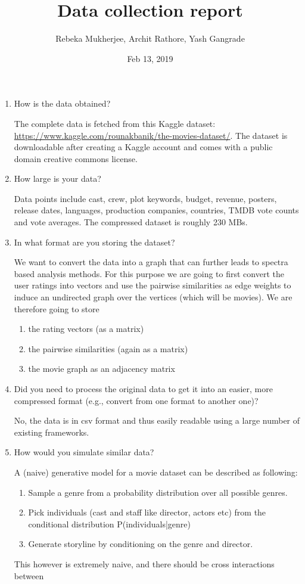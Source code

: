 \documentclass[11pt]{article}
\title{Data collection report}
\author{Rebeka Mukherjee, Archit Rathore, Yash Gangrade}
\date{Feb 13, 2019}
\begin{document}
\maketitle

\begin{enumerate}

\item How is the data obtained?

The complete data is fetched from this Kaggle dataset: \url{https://www.kaggle.com/rounakbanik/the-movies-dataset/}. The dataset is downloadable after creating a Kaggle account and comes with a public domain creative commons license.

\item How large is your data?

Data points include cast, crew, plot keywords, budget, revenue, posters, release dates, languages, production companies, countries, TMDB vote counts and vote averages. The compressed dataset is roughly 230 MBs.

\item In what format are you storing the dataset?

We want to convert the data into a graph that can further leads to spectra based analysis methods. For this purpose we are going to first convert the user ratings into vectors and use the pairwise similarities as edge weights to induce an undirected graph over the vertices (which will be movies). We are therefore going to store
\begin{enumerate}
	\item the rating vectors (as a matrix)
	\item the pairwise similarities (again as a matrix)
	\item the movie graph as an adjacency matrix
\end{enumerate}

\item Did you need to process the original data to get it into an easier, more compressed format (e.g., convert from one format to another one)?

No, the data is in csv format and thus easily readable using a large number of existing frameworks.

\item How would you simulate similar data?

A (naive) generative model for a movie dataset can be described as following:
	\begin{enumerate}
		\item Sample a genre from a probability distribution over all possible genres.
		\item Pick individuals (cast and staff like director, actors etc) from the conditional distribution P(individuals|genre)
		\item Generate storyline by conditioning on the genre and director.
	\end{enumerate}
This however is extremely naive, and there should be cross interactions between 
\end{enumerate}
\end{document}
